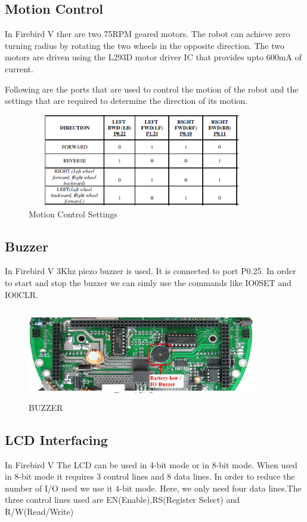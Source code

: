 \documentclass{article}
\begin{document}
\subsection{Motion Control}
\hspace{.5in}
In Firebird V ther are two 75RPM geared motors. The robot can achieve zero turning radius by rotating the two wheels in the opposite direction.
The two motors are driven using the L293D motor driver IC that provides upto 600mA of current.\vspace{.1in}

\hspace{.3in}
Following are the ports that are used to control the motion of the robot and the settings that are required to determine the direction of its motion.

\begin{figure}[h]
\centering
\includegraphics[width=10cm,height=4cm]{motioncontrol.PNG}
\caption{Motion Control Settings}
\end{figure}

\subsection{Buzzer}
In Firebird V 3Khz piezo buzzer is used. It is connected to port P0.25. In order to start and stop the buzzer we can simly use the commands like IO0SET and IO0CLR.  

\begin{figure}[h]
\centering
\includegraphics[width=10cm,height=4cm]{buzzer.PNG}
\caption{BUZZER}
\end{figure}

\subsection{LCD Interfacing}
\hspace{.5in}In Firebird V The LCD can be used in 4-bit mode or in 8-bit mode. When used in 8-bit mode it requires 3 control lines and 8 data lines. In order to reduce the number of I/O used we use it 4-bit mode. Here, we only need four data lines.The three control lines used are EN(Enable),RS(Register Select) and R/W(Read/Write)\vspace{.1in}
\end{document}

